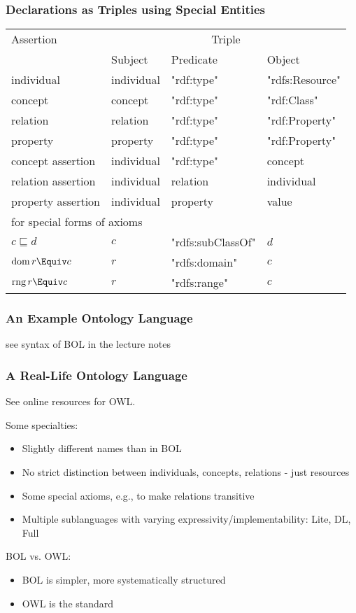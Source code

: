 \begin{frame}\frametitle{Declarations as Triples using Special Entities}
\begin{center}
\begin{tabular}{l|lll}
Assertion & \multicolumn{3}{c}{Triple} \\
          & Subject & Predicate & Object \\
\hline
individual & individual & "rdf:type" & "rdfs:Resource" \\
concept  & concept & "rdf:type" & "rdf:Class" \\
relation & relation & "rdf:type" & "rdf:Property" \\
property & property & "rdf:type" & "rdf:Property" \\
concept assertion  & individual & "rdf:type" & concept \\
relation assertion & individual & relation & individual \\
property assertion & individual & property & value \\
\hline
\multicolumn{4}{l}{for special forms of axioms}\\
$c\sqsubseteq d$ & $c$ & "rdfs:subClassOf" & $d$ \\
$\dom\,r\Equiv c$ & $r$ & "rdfs:domain" & $c$ \\
$\rng\, r\Equiv c$ & $r$ & "rdfs:range" & $c$ \\
\end{tabular}
\end{center}
\end{frame}

\begin{frame}\frametitle{An Example Ontology Language}
see syntax of BOL in the lecture notes
\end{frame}

\begin{frame}\frametitle{A Real-Life Ontology Language}
See online resources for OWL.

Some specialties:
\begin{itemize}
\item Slightly different names than in BOL
\item No strict distinction between individuals, concepts, relations - just resources
\item Some special axioms, e.g., to make relations transitive
\item Multiple sublanguages with varying expressivity/implementability: Lite, DL, Full
\end{itemize}

BOL vs. OWL:
\begin{itemize}
\item BOL is simpler, more systematically structured 
\item OWL is the standard 
\end{itemize}
\end{frame}

